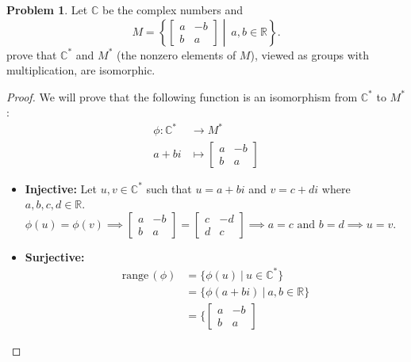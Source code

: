 \documentclass[12pt,reqno]{article}
\newcommand{\range}{\mathrm{range\,}}
\newcommand{\R}{\mathbb{R}}
\newcommand{\C}{\mathbb{C}}
\theoremstyle{plain}
\theoremstyle{definition}
\newtheorem{problem}{Problem}
\begin{document}
\newpage


\begin{problem} 
    Let $\mathbb{C}$ be the complex numbers and 
    $$
    M = \left \{
    \begin{bmatrix}
       a  & -b \\
       b  &  a
    \end{bmatrix}
    \middle| \  a,b \in \mathbb{R}
    \right \}.
    $$
    prove that $\mathbb{C}^*$ and $M^*$ (the nonzero elements of $M$), viewed as groups with multiplication, are isomorphic. 
\end{problem}

\begin{proof}
    We will prove that the following function is an isomorphism from \(\C^*\) to \(M^*\):
    \begin{align*}
        \phi:\C^*&\to M^*\\
        a+bi&\mapsto \begin{bmatrix}
            a & -b\\
            b & a
        \end{bmatrix}
    \end{align*} 
    \begin{itemize}
        \item \textbf{Injective: } Let \(u,v\in\C^*\) such that \(u=a+bi\) and \(v=c+di\) where \(a,b,c,d\in\R\).
        \(\phi(u)=\phi(v)\implies
            \begin{bmatrix}
                a & -b\\
                b & a
            \end{bmatrix}
            =
            \begin{bmatrix}
                c & -d\\
                d & c
            \end{bmatrix}
        \implies a=c\text{ and }b=d\implies u=v\).
        \item \textbf{Surjective: }
        \begin{align*}
            \range(\phi) &= \{\phi(u)\ |\ u\in\C^*\}\\
            &= \{\phi(a+bi)\ |\ a,b\in\R\}\\
            &= 
            \biggl\{
                \begin{bmatrix}
                    a & -b\\
                    b & a
                \end{bmatrix}

\end{align*}
\end{itemize}
\end{proof}
\end{document}
